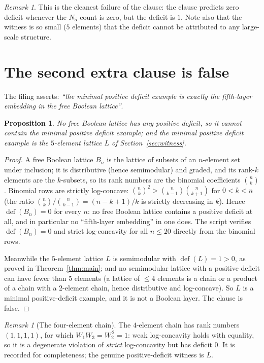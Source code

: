 \documentclass[11pt]{article}
\newtheorem{proposition}[theorem]{Proposition}
\theoremstyle{definition}
\theoremstyle{remark}
\newtheorem{remark}[theorem]{Remark}
\begin{document}
\begin{remark}
This is the cleanest failure of the clause: the clause predicts zero deficit
whenever the $N_5$ count is zero, but the deficit is $1$. Note also that the
witness is so small ($5$ elements) that the deficit cannot be attributed to any
large-scale structure.
\end{remark}

\section{The second extra clause is false}\label{sec:clause2}

The filing asserts: \emph{``the minimal positive deficit example is exactly the
fifth-layer embedding in the free Boolean lattice''}.

\begin{proposition}\label{prop:clause2}
No free Boolean lattice has any positive deficit, so it cannot contain the
minimal positive deficit example; and the minimal positive deficit example is
the $5$-element lattice $L$ of Section~\ref{sec:witness}.
\end{proposition}

\begin{proof}
A free Boolean lattice $B_n$ is the lattice of subsets of an $n$-element set
under inclusion; it is distributive (hence semimodular) and graded, and its
rank-$k$ elements are the $k$-subsets, so its rank numbers are the binomial
coefficients $\binom{n}{k}$. Binomial rows are strictly log-concave:
$\binom{n}{k}^2 > \binom{n}{k-1}\binom{n}{k+1}$ for $0<k<n$ (the ratio
$\binom{n}{k}/\binom{n}{k-1} = (n-k+1)/k$ is strictly decreasing in $k$).
Hence $\operatorname{def}(B_n) = 0$ for every $n$: no free Boolean lattice
contains a positive deficit at all, and in particular no ``fifth-layer
embedding'' in one does. The script verifies $\operatorname{def}(B_n)=0$ and
strict log-concavity for all $n \le 20$ directly from the binomial rows.

Meanwhile the $5$-element lattice $L$ is semimodular with
$\operatorname{def}(L)=1 > 0$, as proved in Theorem~\ref{thm:main}; and no
semimodular lattice with a positive deficit can have fewer than $5$ elements
(a lattice of $\le 4$ elements is a chain or a product of a chain with a
$2$-element chain, hence distributive and log-concave). So $L$ is a minimal
positive-deficit example, and it is not a Boolean layer. The clause is false.
\end{proof}

\begin{remark}[The four-element chain]
The $4$-element chain has rank numbers $(1,1,1,1)$, for which
$W_1W_3 = W_2^{\,2} = 1$: weak log-concavity holds with equality, so it is a
degenerate violation of \emph{strict} log-concavity but has deficit $0$. It is
recorded for completeness; the genuine positive-deficit witness is $L$.
\end{remark}
\end{document}

